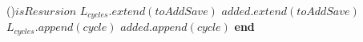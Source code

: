 \begin{algorithm}
{                    \eIf(){$isResursion$}
                    {
                    }
                    {
                        $L_{cycles}.extend(toAddSave)$\;
                        $added.extend(toAddSave)$\;
                        {
                            {
                                $L_{cycles}.append(cycle)$\;
                                $added.append(cycle)$\;
                            }
                        }
                    }
                }{\textbf{end}}
            \vspace*{0.5em}

        \end{algorithm}

        \newpage

